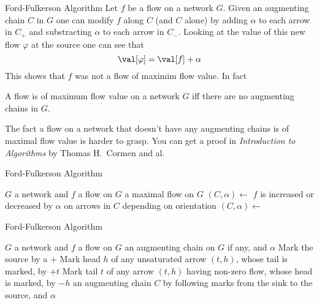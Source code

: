 \documentclass[32pt, aspectratio=169]{beamer}
\begin{document}
\begin{frame}{Ford-Fulkerson Algorithm}
  Let $f$ be a flow on a network $G$. Given an augmenting chain $C$ in
  $G$ one can modify $f$ along $C$ (and $C$ alone) by adding $\alpha$
  to each arrow in $C_+$ and substracting $\alpha$ to each arrow in
  $C_-$. Looking at the value of this new flow $\varphi$ at the source
  one can see that
  \begin{displaymath}
    \val[\varphi] = \val[f] + \alpha
  \end{displaymath}
  This shows that $f$ was not a flow of maximim flow value. \pause In fact
  \begin{prop}
    A flow is of maximum flow value on a network $G$ iff there are no
    augmenting chains in $G$.
  \end{prop}
  \pause
  \begin{rem}
    The fact a flow on a network that doesn't have any augmenting
    chains is of maximal flow value is harder to grasp. You can get a
    proof in \emph{Introduction to Algorithms} by Thomas H.~Cormen and
    al.
  \end{rem}
\end{frame}

\begin{frame}{Ford-Fulkerson Algorithm}
  \begin{algorithm}[H]
    \caption{Ford-Fulkerson Algorithm}
    \small{
      \begin{algorithmic}[1]
       \Statex
       \Require $G$ a network and $f$ a flow on $G$
       \Ensure a maximal flow on $G$
       \Statex
       \State $(C, \alpha) \gets$ 
       \State $f$ is increased or decreased by $\alpha$ on arrows in $C$ depending on orientation
       \State $(C, \alpha) \gets$ 
       \EndWhile
       \EndProcedure
       \Statex
     \end{algorithmic}
     }
    \end{algorithm}
\end{frame}

\begin{frame}{Ford-Fulkerson Algorithm}
  \begin{algorithm}[H]
    \caption{Finding an augmenting chain}
    \small{
    \begin{algorithmic}[1]
      \Statex
      \Require $G$ a network and $f$ a flow on $G$
      \Ensure an augmenting chain on $G$ if any, and $\alpha$
      \Statex
      \State Mark the source by a $+$
      \State Mark head $h$ of any unsaturated arrow $(t, h)$, whose tail is marked, by $+t$
      \State Mark tail $t$ of any arrow $(t, h)$ having non-zero flow, whose head is marked, by $-h$
      \State \Return an augmenting chain $C$ by following marks from the sink to the source, and $\alpha$
      \EndIf
      \EndFunction
      \Statex
    \end{algorithmic}
    }
   \end{algorithm}
\end{frame}
\end{document}
